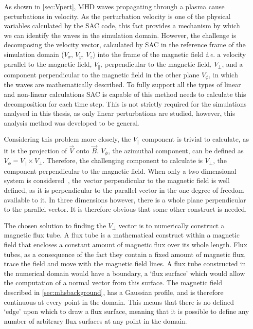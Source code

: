 As shown in \cref{sec:Vpert}, MHD waves propagating through a plasma cause perturbations in velocity.
As the perturbation velocity is one of the physical variables calculated by the SAC code, this fact provides a mechanism by which we can identify the waves in the simulation domain.
However, the challenge is decomposing the velocity vector, calculated by SAC in the reference frame of the simulation domain ($V_x$, $V_y$, $V_z$) into the frame of the magnetic field \textit{i.e.} a velocity parallel to the magnetic field, $V_\parallel$, perpendicular to the magnetic field, $V_\perp$, and a component perpendicular to the magnetic field in the other plane $V_\phi$, in which the waves are mathematically described.
To fully support all the types of linear and non-linear calculations SAC is capable of this method needs to calculate this decomposition for each time step.
This is not strictly required for the simulations analysed in this thesis, as only linear perturbations are studied, however, this analysis method was developed to be general.

Considering this problem more closely, the $V_\parallel$ component is trivial to calculate, as it is the projection of $\vec{V}$ onto $\vec{B}$.
$V_\phi$, the azimuthal component, can be defined as $V_\phi = V_\parallel \times V_\perp$.
Therefore, the challenging component to calculate is $V_\perp$, the component perpendicular to the magnetic field.
When only a two dimensional system is considered~\citep[e.g.][]{bogdan2003,fedun2011,shelyag2012}, the vector perpendicular to the magnetic field is well defined, as it is perpendicular to the parallel vector in the one degree of freedom available to it.
In three dimensions however, there is a whole plane perpendicular to the parallel vector.
It is therefore obvious that some other construct is needed.

The chosen solution to finding the $V_\perp$ vector is to numerically construct a magnetic flux tube.
A flux tube is a mathematical construct within a magnetic field that encloses a constant amount of magnetic flux over its whole length.
Flux tubes, as a consequence of the fact they contain a fixed amount of magnetic flux, trace the field and move with the magnetic field lines.
A flux tube constructed in the numerical domain would have a boundary, a `flux surface' which would allow the computation of a normal vector from this surface.
The magnetic field described in \cref{sec:mhsbackground}, has a Gaussian profile, and is therefore continuous at every point in the domain.
This means that there is no defined `edge' upon which to draw a flux surface, meaning that it is possible to define any number of arbitrary flux surfaces at any point in the domain.




